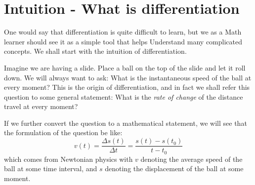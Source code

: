 \documentclass[12pt]{article}
\begin{document}
\section*{Intuition - What is differentiation}
    One would say that differentiation is quite difficult to learn, but we as a Math learner should see it as a simple tool that helps Understand many complicated concepts. We shall start with the intuition of differentiation.

    Imagine we are having a slide. Place a ball on the top of the slide and let it roll down. We will always want to ask: What is the instantaneous speed of the ball at every moment? This is the origin of differentiation, and in fact we shall refer this question to some general statement: What is the \textit{rate of change} of the distance travel at every moment?

    If we further convert the question to a mathematical statement, we will see that the formulation of the question be like: $$v(t)=\frac{\Delta s(t)}{\Delta t}=\frac{s(t)-s(t_0)}{t-t_0}$$ which comes from Newtonian physics with $v$ denoting the average speed of the ball at some time interval, and $s$ denoting the displacement of the ball at some moment.
\end{document}
